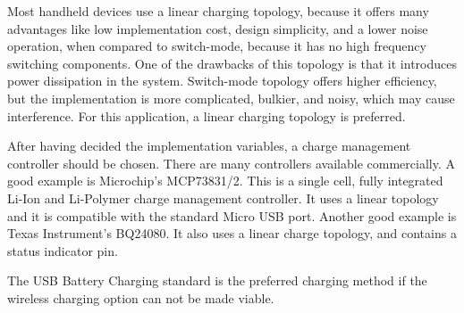 Most handheld devices use a linear charging topology, because it offers many advantages like low implementation cost, design simplicity, and a lower noise operation, when compared to switch-mode, because it has no high frequency switching components. One of the drawbacks of this topology is that it introduces power dissipation in the system. Switch-mode topology offers higher efficiency, but the implementation is more complicated, bulkier, and noisy, which may cause interference. For this application, a linear charging topology is preferred.

After having decided the implementation variables, a charge management controller should be chosen. There are many controllers available commercially. A good example is Microchip's MCP73831/2. This is a single cell, fully integrated Li-Ion and Li-Polymer charge management controller. It uses a linear topology and it is compatible with the standard Micro USB port. Another good example is Texas Instrument's BQ24080. It also uses a linear charge topology, and contains a status indicator pin.

The USB Battery Charging standard is the preferred charging method if the wireless charging option can not be made viable.